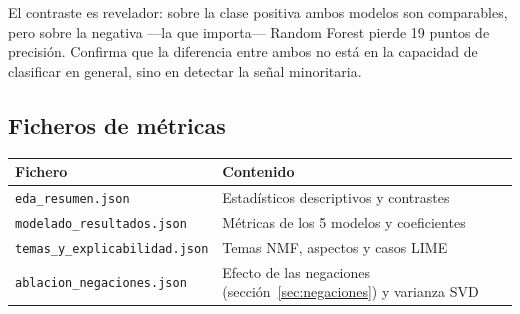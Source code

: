 \documentclass[11pt,a4paper]{article}
\begin{document}
\vspace{0.3cm}
El contraste es revelador: sobre la clase positiva ambos modelos son
comparables, pero sobre la negativa —la que importa— Random Forest pierde
19 puntos de precisión. Confirma que la diferencia entre ambos no está en la
capacidad de clasificar en general, sino en detectar la señal minoritaria.

\subsection*{Ficheros de métricas}

\begin{center}\small
\begin{tabular}{@{}ll@{}}
\toprule
\textbf{Fichero} & \textbf{Contenido} \\ \midrule
\texttt{eda\_resumen.json}            & Estadísticos descriptivos y contrastes \\
\texttt{modelado\_resultados.json}    & Métricas de los 5 modelos y coeficientes \\
\texttt{temas\_y\_explicabilidad.json} & Temas NMF, aspectos y casos LIME \\
\texttt{ablacion\_negaciones.json}    & Efecto de las negaciones (sección~\ref{sec:negaciones}) y varianza SVD \\ \bottomrule
\end{tabular}
\end{center}
\end{document}
